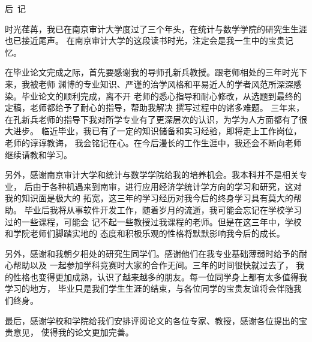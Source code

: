 \centerline{\large\heiti 后\ 记}

\vspace{2ex}

时光荏苒，我已在南京审计大学度过了三个年头，在统计与数学学院的研究生生涯也已接近尾声。
在南京审计大学的这段读书时光，注定会是我一生中的宝贵记忆。

在毕业论文完成之际，首先要感谢我的导师孔新兵教授。跟老师相处的三年时光下来，我被老师
渊博的专业知识、严谨的治学风格和平易近人的学者风范所深深感染。毕业论文的顺利完成，离不开
老师的悉心指导和耐心修改，从选题到最终的定稿，老师都给予了耐心的指导，帮助我解决
撰写过程中的诸多难题。
三年来，在孔新兵老师的指导下我对所学专业有了更深层次的认识，为学为人方面都有了很大进步。
临近毕业，我已有了一定的知识储备和实习经验，即将走上工作岗位，老师的谆谆教诲，
我会铭记在心。在今后漫长的工作生涯中，我还会不断向老师继续请教和学习。

另外，感谢南京审计大学和统计与数学学院给我的培养机会。我本科并不是相关专业，
后由于各种机遇来到南审，进行应用经济学统计学方向的学习和研究，这对我的知识面是极大的
拓宽，这三年的学习经历对我今后的终身学习具有莫大的帮助。
毕业后我将从事软件开发工作，随着岁月的流逝，我可能会忘记在学校学习过的一些课程，可能会
记不起一些教授过我课程的老师。但是在这三年中，学校和学院老师们脚踏实地的
态度和积极乐观的性格将默默影响我今后的成长。

另外，感谢和我朝夕相处的研究生同学们。感谢他们在我专业基础薄弱时给予的耐心帮助以及
一起参加学科竞赛时大家的合作无间。三年的时间很快就过去了，
我的性格也变得更加成熟，认识了越来越多的朋友。每一位同学身上都有太多值得我学习的地方，
毕业只是我们学生生涯的结束，与各位同学的宝贵友谊将会伴随我们终身。

最后，感谢学校和学院给我们安排评阅论文的各位专家、教授，感谢各位提出的宝贵意见，
使得我的论文更加完善。
\vspace{2ex}

\vspace{1ex}
